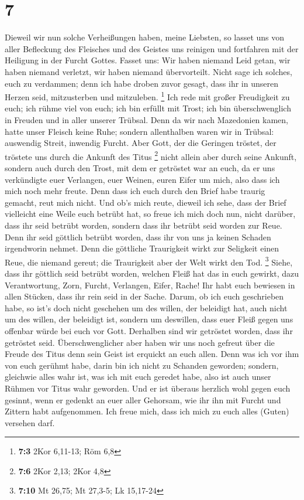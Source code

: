 \hypertarget{section-6}{%
\section{7}\label{section-6}}

 Dieweil wir nun solche Verheißungen haben, meine
Liebsten, so lasset uns von aller Befleckung des Fleisches und des
Geistes uns reinigen und fortfahren mit der Heiligung in der Furcht
Gottes.  Fasset uns: Wir haben niemand Leid getan, wir
haben niemand verletzt, wir haben niemand übervorteilt. 
Nicht sage ich solches, euch zu verdammen; denn ich habe droben zuvor
gesagt, dass ihr in unseren Herzen seid, mitzusterben und mitzuleben.
\footnote{\textbf{7:3} 2Kor 6,11-13; Röm 6,8}  Ich rede
mit großer Freudigkeit zu euch; ich rühme viel von euch; ich bin erfüllt
mit Trost; ich bin überschwenglich in Freuden und in aller unserer
Trübsal.  Denn da wir nach Mazedonien kamen, hatte unser
Fleisch keine Ruhe; sondern allenthalben waren wir in Trübsal: auswendig
Streit, inwendig Furcht.  Aber Gott, der die Geringen
tröstet, der tröstete uns durch die Ankunft des Titus \footnote{\textbf{7:6}
  2Kor 2,13; 2Kor 4,8}  nicht allein aber durch seine
Ankunft, sondern auch durch den Trost, mit dem er getröstet war an euch,
da er uns verkündigte euer Verlangen, euer Weinen, euren Eifer um mich,
also dass ich mich noch mehr freute.  Denn dass ich euch
durch den Brief habe traurig gemacht, reut mich nicht. Und ob's mich
reute, dieweil ich sehe, dass der Brief vielleicht eine Weile euch
betrübt hat,  so freue ich mich doch nun, nicht darüber,
dass ihr seid betrübt worden, sondern dass ihr betrübt seid worden zur
Reue. Denn ihr seid göttlich betrübt worden, dass ihr von uns ja keinen
Schaden irgendworin nehmet.  Denn die göttliche
Traurigkeit wirkt zur Seligkeit einen Reue, die niemand gereut; die
Traurigkeit aber der Welt wirkt den Tod. \footnote{\textbf{7:10} Mt
  26,75; Mt 27,3-5; Lk 15,17-24}  Siehe, dass ihr
göttlich seid betrübt worden, welchen Fleiß hat das in euch gewirkt,
dazu Verantwortung, Zorn, Furcht, Verlangen, Eifer, Rache! Ihr habt euch
bewiesen in allen Stücken, dass ihr rein seid in der Sache.
 Darum, ob ich euch geschrieben habe, so ist's doch nicht
geschehen um des willen, der beleidigt hat, auch nicht um des willen,
der beleidigt ist, sondern um deswillen, dass euer Fleiß gegen uns
offenbar würde bei euch vor Gott.  Derhalben sind wir
getröstet worden, dass ihr getröstet seid. Überschwenglicher aber haben
wir uns noch gefreut über die Freude des Titus denn sein Geist ist
erquickt an euch allen.  Denn was ich vor ihm von euch
gerühmt habe, darin bin ich nicht zu Schanden geworden; sondern,
gleichwie alles wahr ist, was ich mit euch geredet habe, also ist auch
unser Rühmen vor Titus wahr geworden.  Und er ist überaus
herzlich wohl gegen euch gesinnt, wenn er gedenkt an euer aller
Gehorsam, wie ihr ihn mit Furcht und Zittern habt aufgenommen.
 Ich freue mich, dass ich mich zu euch alles (Guten)
versehen darf.

